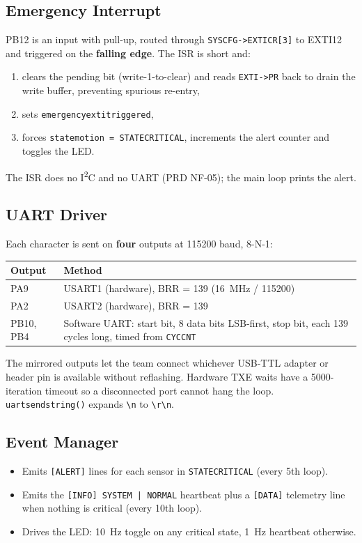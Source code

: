 \documentclass[11pt,a4paper]{article}
\newcommand{\ttu}{\textunderscore}
\begin{document}
\subsection{Emergency Interrupt}
PB12 is an input with pull-up, routed through \texttt{SYSCFG->EXTICR[3]} to EXTI12 and triggered on the \textbf{falling edge}. The ISR is short and:
\begin{enumerate}
  \item clears the pending bit (write-1-to-clear) and reads \texttt{EXTI->PR} back to drain the write buffer, preventing spurious re-entry,
  \item sets \texttt{emergency\ttu exti\ttu triggered},
  \item forces \texttt{state\ttu motion = STATE\ttu CRITICAL}, increments the alert counter and toggles the LED.
\end{enumerate}
The ISR does no I\textsuperscript{2}C and no UART (PRD NF-05); the main loop prints the alert.

\subsection{UART Driver}
Each character is sent on \textbf{four} outputs at 115200 baud, 8-N-1:

\begin{tabularx}{\textwidth}{@{}L{2.4cm} X@{}}
\toprule
\textbf{Output} & \textbf{Method}\\
\midrule
PA9 & USART1 (hardware), BRR = 139 (16~MHz / 115200)\\
PA2 & USART2 (hardware), BRR = 139\\
PB10, PB4 & Software UART: start bit, 8 data bits LSB-first, stop bit, each 139 cycles long, timed from \texttt{CYCCNT}\\
\bottomrule
\end{tabularx}

The mirrored outputs let the team connect whichever USB-TTL adapter or header pin is available without reflashing. Hardware TXE waits have a 5000-iteration timeout so a disconnected port cannot hang the loop. \texttt{uart\ttu send\ttu string()} expands \texttt{\textbackslash n} to \texttt{\textbackslash r\textbackslash n}.

\subsection{Event Manager}
\begin{itemize}
  \item Emits \texttt{[ALERT]} lines for each sensor in \texttt{STATE\ttu CRITICAL} (every 5th loop).
  \item Emits the \texttt{[INFO] SYSTEM | NORMAL} heartbeat plus a \texttt{[DATA]} telemetry line when nothing is critical (every 10th loop).
  \item Drives the LED: 10~Hz toggle on any critical state, 1~Hz heartbeat otherwise.
\end{itemize}
\end{document}
